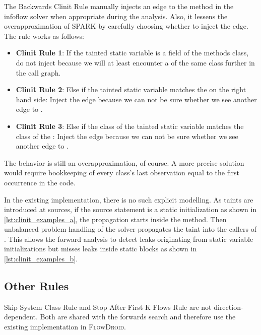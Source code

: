 \documentclass[../draft.tex]{subfiles}
\begin{document}
    The Backwards Clinit Rule manually injects an edge to the  method in the infoflow solver when appropriate during the analysis. 
    Also, it lessens the overapproximation of SPARK by carefully choosing whether to inject the edge. The rule works as follows:
    \begin{itemize}
        \item \textbf{Clinit Rule 1}: If the tainted static variable is a field of the methods class, do not inject because we will at least encounter a  of the same class further in the call graph.
        \item \textbf{Clinit Rule 2}: Else if the tainted static variable matches the  on the right hand side: Inject the edge because we can not be sure whether we see another edge to .
        \item \textbf{Clinit Rule 3}: Else if the class of the tainted static variable matches the class of the : Inject the edge because we can not be sure whether we see another edge to .
    \end{itemize}
    The behavior is still an overapproximation, of course. 
    A more precise solution would require bookkeeping of every class's last observation equal to the first occurrence in the code. 

    In the existing implementation, there is no such explicit modelling. 
    As taints are introduced at sources, if the source statement is a static initialization as shown in \autoref{lst:clinit_examples_a}, the propagation starts inside the  method. 
    Then unbalanced problem handling of the solver propagates the taint into the callers of . 
    This allows the forward analysis to detect leaks originating from static variable initializations but misses leaks inside static blocks as shown in \autoref{lst:clinit_examples_b}.

    \subsection{Other Rules}
    Skip System Class Rule and Stop After First K Flows Rule are not direction-dependent. 
    Both are shared with the forwards search and therefore use the existing implementation in \textsc{FlowDroid}.
    
\end{document}
